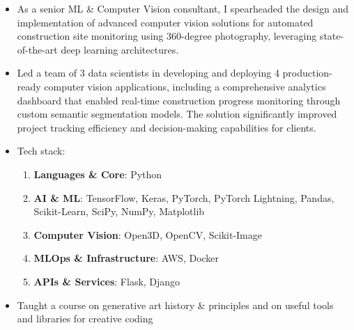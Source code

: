 {
\begin{itemize}
\item As a senior ML \& Computer Vision consultant, I spearheaded the design and implementation of advanced computer vision solutions for automated construction site monitoring using 360-degree photography, leveraging state-of-the-art deep learning architectures.
\item Led a team of 3 data scientists in developing and deploying 4 production-ready computer vision applications, including a comprehensive analytics dashboard that enabled real-time construction progress monitoring through custom semantic segmentation models. The solution significantly improved project tracking efficiency and decision-making capabilities for clients.
\item Tech stack:
\begin{enumerate}
    \item \textbf{Languages \& Core}: {\color{accent2}Python}
    \item \textbf{AI \& ML}: {\color{accent2}TensorFlow, Keras, PyTorch, PyTorch Lightning, Pandas, Scikit-Learn, SciPy, NumPy, Matplotlib}
    \item \textbf{Computer Vision}: {\color{accent2}Open3D, OpenCV, Scikit-Image}
    \item \textbf{MLOps \& Infrastructure}: {\color{accent2}AWS, Docker}
    \item \textbf{APIs \& Services}: {\color{accent2}Flask, Django}
\end{enumerate}
\end{itemize}

\divider

\begin{itemize}
\item Taught a course on generative art history \& principles and on useful tools and libraries for creative coding
\end{itemize}

\divider

}
